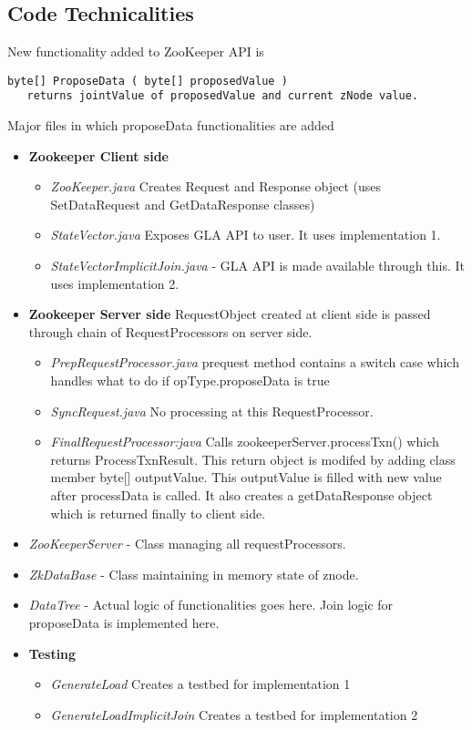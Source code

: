 \documentclass[a4paper,12pt]{report}
\begin{document}
\subsection{Code Technicalities}
New functionality added to ZooKeeper API is 
\begin{verbatim}
byte[] ProposeData ( byte[] proposedValue )
   returns jointValue of proposedValue and current zNode value.
\end{verbatim}

Major files in which proposeData functionalities are added
\begin{itemize}


\item \textbf{Zookeeper Client side}
\begin{itemize}
\item \textit{ZooKeeper.java }  Creates Request and Response object (uses SetDataRequest and GetDataResponse classes)
\item \textit{StateVector.java }  Exposes GLA API to user. It uses implementation 1.
\item \textit{StateVectorImplicitJoin.java} - GLA API is made available through this. It uses implementation 2.
\end{itemize}

\item \textbf{Zookeeper Server side}
RequestObject created at client side is passed through chain of RequestProcessors on server side.
\begin{itemize}
 \item \textit{PrepRequestProcessor.java} prequest method contains a switch case which handles what to do if opType.proposeData is true
\item \textit{SyncRequest.java} No processing at this RequestProcessor. 
\item \textit{FinalRequestProcessor:java} Calls zookeeperServer.processTxn() which returns ProcessTxnResult. This return object is modifed by adding class member byte[] outputValue. This outputValue is filled with new value after processData is called. 	It also creates a getDataResponse object which is returned finally to client side.
\end{itemize}

\item \textit{ZooKeeperServer} - Class managing all requestProcessors.\\
\item \textit{ZkDataBase} - Class maintaining in memory state of znode.\\
\item \textit{DataTree } - Actual logic of functionalities goes here. Join logic for proposeData is implemented here.

\item \textbf{Testing}
\begin{itemize}
\item \textit{GenerateLoad }  Creates a testbed for implementation 1
\item \textit{GenerateLoadImplicitJoin} Creates a testbed for implementation 2
\end{itemize}
\end{itemize}
\end{document}
